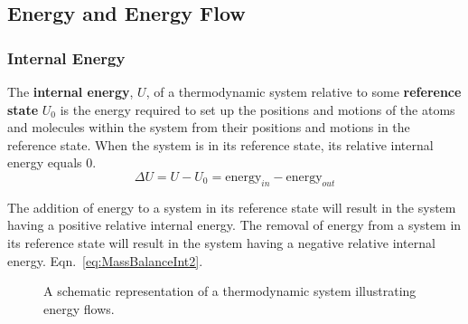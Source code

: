 \subsection{Energy and Energy Flow}
\subsubsection{Internal Energy}
The \textbf{internal energy}, $U$, of a thermodynamic system relative to some \textbf{reference state} $U_0$ is the energy required to set up the positions and motions of the atoms and molecules within the system from their positions and motions in the reference state. When the system is in its reference state, its relative internal energy equals $0$. 
\begin{equation}\label{eq:Ebalance}
\Delta U = U - U_0 = \textrm{energy}_{in} - \textrm{energy}_{out}
\end{equation}
\vspace{12pt}

The addition of energy to a system in its reference state will result in the system having a positive relative internal energy. The removal of energy from a system in its reference state will result in the system having a negative relative internal energy. Eqn.~\eqref{eq:MassBalanceInt2}.

\begin{figure}[h]
\begin{center}
\end{center}
\caption{A schematic representation of a thermodynamic system illustrating energy flows.}\label{fig:SysSchematic}
\end{figure}

